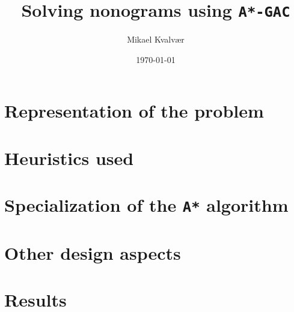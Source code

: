 \documentclass[notitlepage, 10pt, twocolumn]{report} %
\title{Solving nonograms using \texttt{A*-GAC}}
\author{Mikael Kvalvær}
\date{\today}
\begin{document}
\maketitle

\section{Representation of the problem}
  

\section{Heuristics used}
  

\section{Specialization of the \texttt{A*} algorithm}
  

\section{Other design aspects}
  

\section{Results}
  

%   
\end{document}
